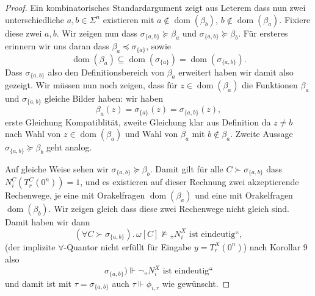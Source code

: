 \documentclass[nofonts]{uebung}
\DeclareMathOperator{\dom}{dom}
\begin{document}
\begin{proof}
    Ein kombinatorisches Standardargument zeigt aus Leterem dass nun zwei unterschiedliche $a,b\in \Sigma^n$ existieren mit $a\not\in \dom(\beta_b)$, $b\not\in \dom(\beta_a)$. Fixiere diese zwei $a,b$.
    Wir zeigen nun dass $\sigma_{\{a,b\}} \succeq \beta_a$ und $\sigma_{\{a,b\}} \succeq \beta_b$.
    Für ersteres erinnern wir uns daran dass $\beta_a\preceq\sigma_{\{a\}}$, sowie
    \[ \dom(\beta_a)\subseteq \dom(\sigma_{\{a\}})=\dom(\sigma_{\{a,b\}}). \]
    Dass $\sigma_{\{a,b\}}$ also den Definitionsbereich von $\beta_a$ erweitert haben wir damit also gezeigt. Wir müssen nun noch zeigen, dass für $z\in\dom(\beta_a)$ die Funktionen $\beta_a$ und $\sigma_{\{a,b\}}$ gleiche Bilder haben: wir haben
    \[ \beta_a(z)=\sigma_{\{a\}}(z)=\sigma_{\{a,b\}}(z), \]
    erste Gleichung Kompatiblität, zweite Gleichung klar aus Definition da $z\neq b$ nach Wahl von $z\in\dom(\beta_a)$ und Wahl von $\beta_a$ mit $b\not\in \beta_a$.
    Zweite Aussage $\sigma_{\{a,b\}} \succeq \beta_b$ geht analog.

    Auf gleiche Weise sehen wir $\sigma_{\{a,b\}} \succeq \beta_b$.
    Damit gilt für alle $C\succ \sigma_{\{a,b\}}$ dass $N^C_i(T^C_r(0^n))=1$,
    und es existieren auf dieser Rechnung zwei akzeptierende Rechenwege, je eine mit Orakelfragen $\dom(\beta_a)$ und eine mit Orakelfragen $\dom(\beta_b)$. Wir zeigen gleich dass diese zwei Rechenwege nicht gleich sind. Damit haben wir dann 
    \[ (\forall C\succ \sigma_{\{a,b\}}).\,\omega[C]\not\vDash\text{„$N_i^X$ ist eindeutig“}, \]
    (der implizite $\forall$-Quantor nicht erfüllt für Eingabe $y=T_r^X(0^n)$)
    nach Korollar 9 also
    \[ \sigma_{\{a,b\}}) \Vdash\neg\text{„$N_i^X$ ist eindeutig“} \]
    und damit ist mit $\tau=\sigma_{\{a,b\}}$ auch $\tau\Vdash \phi_{i,r}$ wie gewünscht.


\end{proof}
\end{document}
